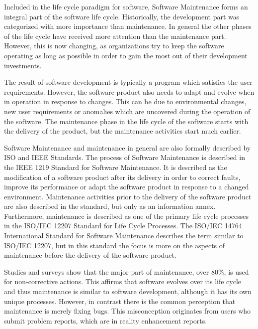 Included in the life cycle paradigm for software, Software Maintenance forms an integral part of the software life cycle. Historically, the development part was categorized with more importance than maintenance. In general the other phases of the life cycle have received more attention than the maintenance part. However, this is now changing, as organizations try to keep the software operating as long as possible in order to gain the most out of their development investments.\citep{pigoski_software_2015}

The result of software development is typically a program which satisfies the user requirements. However, the software product also needs to adapt and evolve when in operation in response to changes. This can be due to environmental changes, new user requirements or anomalies which are uncovered during the operation of the software. The maintenance phase in the life cycle of the software starts with the delivery of the product, but the maintenance activities start much earlier.\citep{pigoski_software_2015}

Software Maintenance and maintenance in general are also formally described by ISO and IEEE Standards. The process of Software Maintenance is described in the IEEE 1219 Standard for Software Maintenance. It is described as the modification of a software product after its delivery in order to correct faults, improve its performance or adapt the software product in response to a changed environment. Maintenance activities prior to the delivery of the software product are also described in the standard, but only as an information annex. Furthermore, maintenance is described as one of the primary life cycle processes in the ISO/IEC 12207 Standard for Life Cycle Processes. The ISO/IEC 14764 International Standard for Software Maintenance describes the term similar to ISO/IEC 12207, but in this standard the focus is more on the aspects of maintenance before the delivery of the software product.\citep{pigoski_software_2015}

Studies and surveys show that the major part of maintenance, over 80\%, is used for non-corrective actions. This affirms that software evolves over its life cycle and thus maintenance is similar to software development, although it has its own unique processes. However, in contrast there is the common perception that maintenance is merely fixing bugs. This misconception originates from users who submit problem reports, which are in reality enhancement reports.\citep{pigoski_software_2015}

